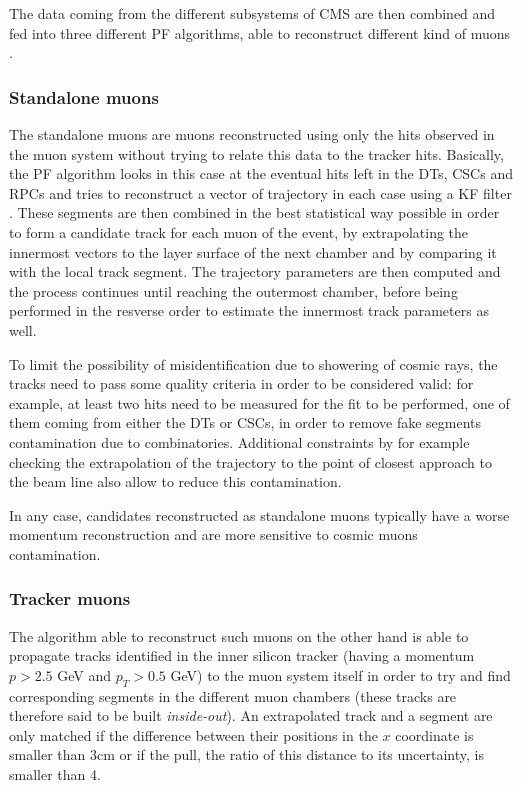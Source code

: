 \documentclass[a4paper, 10pt, openright]{report}
\begin{document}
The data coming from the different subsystems of \ac{CMS} are then combined and fed into three different \ac{PF} algorithms, able to reconstruct different kind of muons \cite{MuonSystemsEff}.

\subsubsection*{Standalone muons}
The standalone muons are muons reconstructed using only the hits observed in the muon system without trying to relate this data to the tracker hits. Basically, the \ac{PF} algorithm looks in this case at the eventual hits left in the \acp{DT}, \acp{CSC} and \acp{RPC} and tries to reconstruct a vector of trajectory in each case using a \ac{KF} filter \cite{KF}. These segments are then combined in the best statistical way possible in order to form a candidate track for each muon of the event, by extrapolating the innermost vectors to the layer surface of the next chamber and by comparing it with the local track segment. The trajectory parameters are then computed and the process continues until reaching the outermost chamber, before being performed in the resverse order to estimate the innermost track parameters as well.

To limit the possibility of misidentification due to showering of cosmic rays, the tracks need to pass some quality criteria in order to be considered valid: for example, at least two hits need to be measured for the fit to be performed, one of them coming from either the \acp{DT} or \acp{CSC}, in order to remove fake segments contamination due to combinatories. Additional constraints by for example checking the extrapolation of the trajectory to the point of closest approach to the beam line also allow to reduce this contamination.

In any case, candidates reconstructed as standalone muons typically have a worse momentum reconstruction and are more sensitive to cosmic muons contamination.  

\subsubsection*{Tracker muons}
The algorithm able to reconstruct such muons on the other hand is able to propagate tracks identified in the inner silicon tracker (having a momentum $p > 2.5$ GeV and $p_T > 0.5$ GeV) to the muon system itself in order to try and find corresponding segments in the different muon chambers (these tracks are therefore said to be built \textit{inside-out}). An extrapolated track and a segment are only matched if the difference between their positions in the $x$ coordinate is smaller than 3cm or if the pull, the ratio of this distance to its uncertainty, is smaller than 4.
\end{document}
